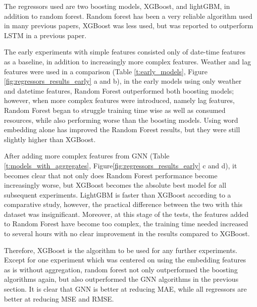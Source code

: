 \documentclass{article}
\begin{document}
The regressors used are two boosting models, XGBoost\cite{Chen2016}, and lightGBM\cite{Ke2017}, in addition to random forest. Random forest has been a very reliable algorithm used in many previous papers, XGBoost was less used, but was reported to outperform LSTM in a previous paper\cite{Liang2022}. 

The early experiments with simple features consisted only of date-time features as a baseline, in addition to increasingly more complex features. Weather and lag features were used in a comparison (Table \ref{t:early_models}, Figure \ref{fig:regressors_results_early} a and b), in the early models using only weather and datetime features, Random Forest outperformed both boosting models; however, when more complex features were introduced, namely lag features, Random Forest began to struggle training time wise as well as consumed resources, while also performing worse than the boosting models. Using word embedding alone has improved the Random Forest results, but they were still slightly higher than XGBoost.

After adding more complex features from GNN (Table \ref{t:models_with_aggregates}, Figure\ref{fig:regressors_results_early} c and d), it becomes clear that not only does Random Forest performance become increasingly worse, but XGBoost becomes the absolute best model for all subsequent experiments. LightGBM is faster than XGBoost according to a comparative study\cite{Anggraini2024}, however, the practical difference between the two with this dataset was insignificant. Moreover, at this stage of the tests, the features added to Random Forest have become too complex, the training time needed increased to several hours with no clear improvement in the results compared to XGBoost.

Therefore, XGBoost is the algorithm to be used for any further experiments. Except for one experiment which was centered on using the embedding features as is without aggregation, random forest not only outperformed the boosting algorithms again, but also outperformed the GNN algorithms in the previous section. It is clear that GNN is better at reducing MAE, while all regressors are better at reducing MSE and RMSE.
\end{document}
